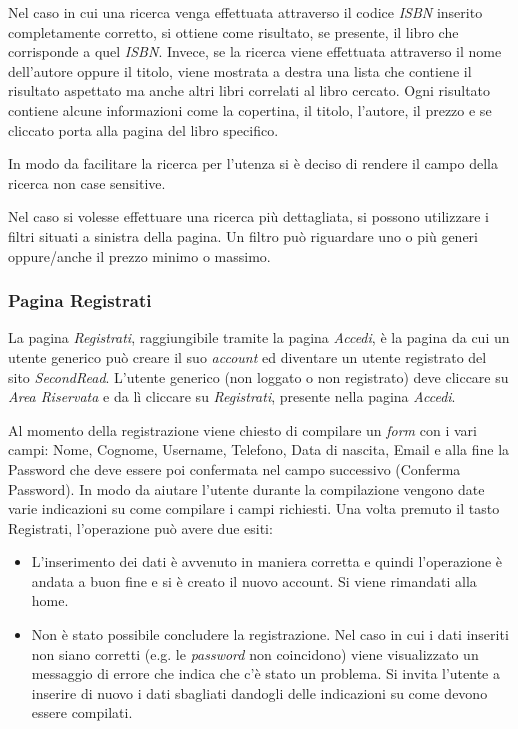 Nel caso in cui una ricerca venga effettuata attraverso il codice \textit{ISBN} inserito completamente corretto, si ottiene come risultato, se presente, il libro che corrisponde a quel \textit{ISBN}. Invece, se la ricerca viene effettuata attraverso il nome dell’autore oppure il titolo, viene mostrata a destra una lista che contiene il risultato aspettato ma anche altri libri correlati al libro cercato. Ogni risultato contiene alcune informazioni come la copertina, il titolo, l’autore, il prezzo e se cliccato porta alla pagina del libro specifico.

In modo da facilitare la ricerca per l’utenza si è deciso di rendere il campo della ricerca non case sensitive.

Nel caso si volesse effettuare una ricerca più dettagliata, si possono utilizzare i filtri situati a sinistra della pagina. Un filtro può riguardare uno o più generi oppure/anche il prezzo minimo o massimo.

\subsubsection{Pagina Registrati}
La pagina \textit{Registrati}, raggiungibile tramite la pagina \textit{Accedi}, è la pagina da cui un utente generico può creare il suo \textit{account} ed diventare un utente registrato del sito \textit{SecondRead}. L’utente generico (non loggato o non registrato) deve cliccare su \textit{Area Riservata} e da lì cliccare su \textit{Registrati}, presente nella pagina \textit{Accedi}.

Al momento della registrazione viene chiesto di compilare un \textit{form} con i vari campi: Nome, Cognome, Username, Telefono, Data di nascita, Email e alla fine la Password che deve essere poi confermata nel campo successivo (Conferma Password). In modo da aiutare l’utente durante la compilazione vengono date varie indicazioni su come compilare i campi richiesti. Una volta premuto il tasto Registrati, l’operazione può avere due esiti:
\begin{itemize}
	\item L’inserimento dei dati è avvenuto in maniera corretta e quindi l’operazione è andata a buon fine e si è creato il nuovo account. Si viene rimandati alla home.
	\item Non è stato possibile concludere la registrazione. Nel caso in cui i dati inseriti non siano corretti (e.g. le \textit{password} non coincidono) viene visualizzato un messaggio di errore che indica che c’è stato un problema. Si invita l’utente a inserire di nuovo i dati sbagliati dandogli delle indicazioni su come devono essere compilati.
\end{itemize}


